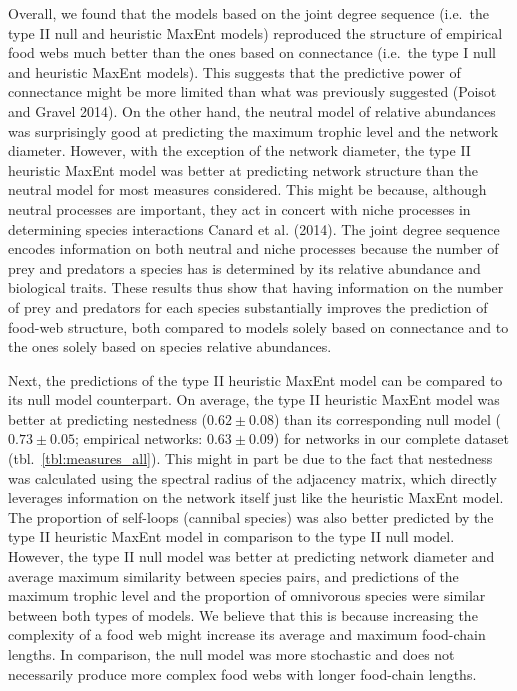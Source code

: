 \documentclass[10pt,oneside]{article}
\begin{document}
Overall, we found that the models based on the joint degree sequence
(i.e.~the type II null and heuristic MaxEnt models) reproduced the
structure of empirical food webs much better than the ones based on
connectance (i.e.~the type I null and heuristic MaxEnt models). This
suggests that the predictive power of connectance might be more limited
than what was previously suggested (Poisot and Gravel 2014). On the
other hand, the neutral model of relative abundances was surprisingly
good at predicting the maximum trophic level and the network diameter.
However, with the exception of the network diameter, the type II
heuristic MaxEnt model was better at predicting network structure than
the neutral model for most measures considered. This might be because,
although neutral processes are important, they act in concert with niche
processes in determining species interactions Canard et al. (2014). The
joint degree sequence encodes information on both neutral and niche
processes because the number of prey and predators a species has is
determined by its relative abundance and biological traits. These
results thus show that having information on the number of prey and
predators for each species substantially improves the prediction of
food-web structure, both compared to models solely based on connectance
and to the ones solely based on species relative abundances.

Next, the predictions of the type II heuristic MaxEnt model can be
compared to its null model counterpart. On average, the type II
heuristic MaxEnt model was better at predicting nestedness
(\(0.62 \pm 0.08\)) than its corresponding null model
(\(0.73 \pm 0.05\); empirical networks: \(0.63 \pm 0.09\)) for networks
in our complete dataset (tbl.~\ref{tbl:measures_all}). This might in
part be due to the fact that nestedness was calculated using the
spectral radius of the adjacency matrix, which directly leverages
information on the network itself just like the heuristic MaxEnt model.
The proportion of self-loops (cannibal species) was also better
predicted by the type II heuristic MaxEnt model in comparison to the
type II null model. However, the type II null model was better at
predicting network diameter and average maximum similarity between
species pairs, and predictions of the maximum trophic level and the
proportion of omnivorous species were similar between both types of
models. We believe that this is because increasing the complexity of a
food web might increase its average and maximum food-chain lengths. In
comparison, the null model was more stochastic and does not necessarily
produce more complex food webs with longer food-chain lengths.
\end{document}
